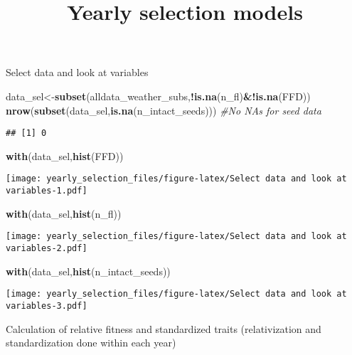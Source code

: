 \documentclass[]{article}
\title{Yearly selection models}
\author{}
\date{}
\newenvironment{Shaded}{\begin{snugshade}}{\end{snugshade}}
\newcommand{\KeywordTok}[1]{\textcolor[rgb]{0.13,0.29,0.53}{\textbf{#1}}}
\newcommand{\CommentTok}[1]{\textcolor[rgb]{0.56,0.35,0.01}{\textit{#1}}}
\newcommand{\OperatorTok}[1]{\textcolor[rgb]{0.81,0.36,0.00}{\textbf{#1}}}
\newcommand{\NormalTok}[1]{#1}
\begin{document}
\maketitle

Select data and look at variables

\begin{Shaded}
\begin{Highlighting}[]
\NormalTok{data_sel<-}\KeywordTok{subset}\NormalTok{(alldata_weather_subs,}\OperatorTok{!}\KeywordTok{is.na}\NormalTok{(n_fl)}\OperatorTok{&!}\KeywordTok{is.na}\NormalTok{(FFD)) }
\KeywordTok{nrow}\NormalTok{(}\KeywordTok{subset}\NormalTok{(data_sel,}\KeywordTok{is.na}\NormalTok{(n_intact_seeds))) }\CommentTok{#No NAs for seed data}
\end{Highlighting}
\end{Shaded}

\begin{verbatim}
## [1] 0
\end{verbatim}

\begin{Shaded}
\begin{Highlighting}[]
\KeywordTok{with}\NormalTok{(data_sel,}\KeywordTok{hist}\NormalTok{(FFD))}
\end{Highlighting}
\end{Shaded}

\texttt{[image: yearly\_selection\_files/figure-latex/Select data and look at variables-1.pdf]}

\begin{Shaded}
\begin{Highlighting}[]
\KeywordTok{with}\NormalTok{(data_sel,}\KeywordTok{hist}\NormalTok{(n_fl))}
\end{Highlighting}
\end{Shaded}

\texttt{[image: yearly\_selection\_files/figure-latex/Select data and look at variables-2.pdf]}

\begin{Shaded}
\begin{Highlighting}[]
\KeywordTok{with}\NormalTok{(data_sel,}\KeywordTok{hist}\NormalTok{(n_intact_seeds))}
\end{Highlighting}
\end{Shaded}

\texttt{[image: yearly\_selection\_files/figure-latex/Select data and look at variables-3.pdf]}

Calculation of relative fitness and standardized traits (relativization
and standardization done within each year)
\end{document}
